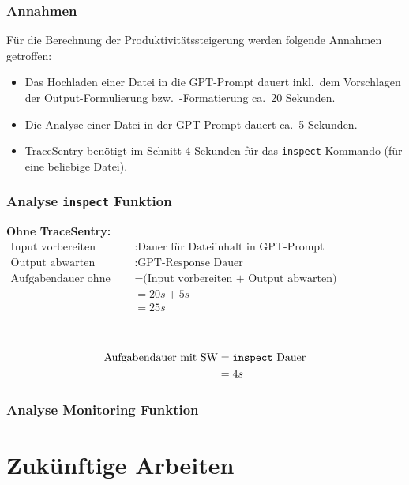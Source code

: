 \documentclass[a4paper,12pt]{report}
\begin{document}
    \subsubsection{Annahmen}
    Für die Berechnung der Produktivitätssteigerung werden folgende Annahmen getroffen:
    \begin{itemize}
        \item Das Hochladen einer Datei in die GPT-Prompt dauert inkl.\ dem Vorschlagen der Output-Formulierung bzw.\ -Formatierung ca.\ 20 Sekunden.
        \item Die Analyse einer Datei in der GPT-Prompt dauert ca.\ 5 Sekunden.
        \item TraceSentry benötigt im Schnitt 4 Sekunden für das \texttt{inspect} Kommando (für eine beliebige Datei).
    \end{itemize}

    \clearpage

    \subsubsection{Analyse \texttt{inspect} Funktion}
    \textbf{Ohne TraceSentry:} \\
    \begin{align*}
        \text{Input vorbereiten}&: \text{Dauer für Dateiinhalt in GPT-Prompt kopieren/hochladen}\\
        \text{Output abwarten}&: \text{GPT-Response Dauer} \\
        \text{Aufgabendauer ohne SW} &= \text{(Input vorbereiten + Output abwarten)} \\
        &= 20s + 5s \\
        &= 25s \\
    \end{align*}

     \\
    \begin{align*}
        \text{Aufgabendauer mit SW} &= \text{\texttt{inspect} Dauer} \\
        &= 4s
    \end{align*}

    \subsubsection{Analyse Monitoring Funktion}

    \clearpage


    \section{Zukünftige Arbeiten}\label{sec:zukunftigearbeiten}
\end{document}
